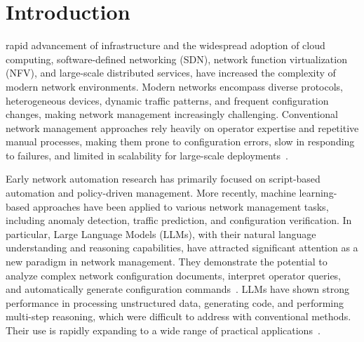 \section{Introduction}
 rapid advancement of infrastructure and the widespread adoption of cloud computing, software-defined networking (SDN), network function virtualization (NFV), and large-scale distributed services, have increased the complexity of modern network environments.
Modern networks encompass diverse protocols, heterogeneous devices, dynamic traffic patterns, and frequent configuration changes, making network management increasingly challenging.
Conventional network management approaches rely heavily on operator expertise and repetitive manual processes, making them prone to configuration errors, slow in responding to failures, and limited in scalability for large-scale deployments~\cite{mao2017neural, meng2020interpreting}.


Early network automation research has primarily focused on script-based automation and policy-driven management.
More recently, machine learning-based approaches have been applied to various network management tasks, including anomaly detection, traffic prediction, and configuration verification.
In particular, Large Language Models (LLMs), with their natural language understanding and reasoning capabilities, have attracted significant attention as a new paradigm in network management. They demonstrate the potential to analyze complex network configuration documents, interpret operator queries, and automatically generate configuration commands~\cite{liu2025large, wu2024netllm}.
LLMs have shown strong performance in processing unstructured data, generating code, and performing multi-step reasoning, which were difficult to address with conventional methods. Their use is rapidly expanding to a wide range of practical applications~\cite{ref1, ref4, ref27}.

